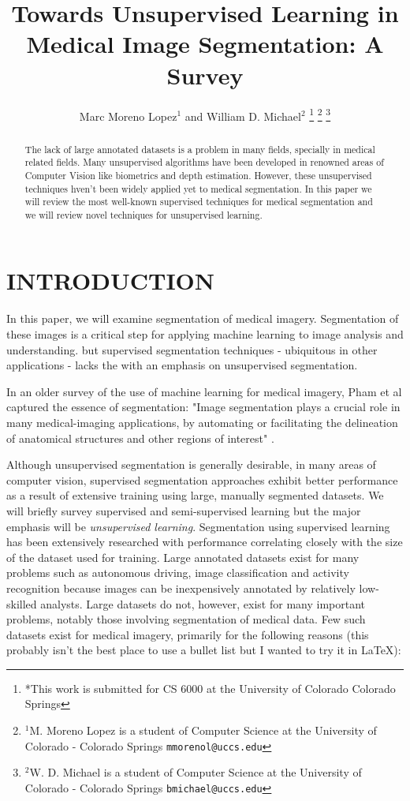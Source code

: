 \documentclass[letterpaper, 10 pt, conference]{ieeeconf}  %
\title{\LARGE \bf
Towards Unsupervised Learning in Medical Image Segmentation: A Survey
}
\author{Marc Moreno Lopez$^{1}$ and William D. Michael$^{2}$%
\thanks{*This work is submitted for CS 6000 at the University of Colorado Colorado Springs}%
\thanks{$^{1}$M. Moreno Lopez is a student of Computer Science at the University of Colorado - Colorado Springs
        {\tt\small mmorenol@uccs.edu}}%
\thanks{$^{2}$W. D. Michael is a student of Computer Science at the University of Colorado - Colorado Springs
        {\tt\small bmichael@uccs.edu}}%
}
\begin{document}
\maketitle
\thispagestyle{empty}
\pagestyle{empty}

\begin{abstract}

The lack of large annotated datasets is a problem in many fields, specially in medical related fields. Many unsupervised algorithms have been developed in renowned areas of Computer Vision like biometrics and depth estimation. However, these unsupervised techniques hven't been widely applied yet to medical segmentation. In this paper we will review the most well-known supervised techniques for medical segmentation and we will review novel techniques for unsupervised learning.

\end{abstract}

\section{INTRODUCTION}
In this paper, we will examine segmentation of medical imagery. Segmentation of these images is a critical step for applying machine learning to image analysis and understanding. but supervised segmentation techniques - ubiquitous in other applications -  lacks the with an emphasis on unsupervised segmentation. 

In an older survey of the use of machine learning for medical imagery, Pham et al captured the essence of segmentation: "Image segmentation plays a crucial role in many medical-imaging applications, by automating or facilitating the delineation of anatomical structures and other regions of interest" \cite{pham2000current}.

Although unsupervised segmentation is generally desirable, in many areas of computer vision, supervised segmentation approaches exhibit better performance as a result of extensive training using large, manually segmented datasets. We will briefly survey supervised and semi-supervised learning but the major emphasis will be \textit{unsupervised learning}. Segmentation using supervised learning has been extensively researched with performance correlating closely with the size of the dataset used for training. Large annotated datasets exist for many problems such as autonomous driving, image classification and activity recognition because images can be inexpensively annotated by relatively low-skilled analysts. Large datasets do not, however, exist for many important problems, notably those involving segmentation of medical data. Few such datasets exist for medical imagery, primarily for the following reasons (this probably isn't the best place to use a bullet list but I wanted to try it in \LaTeX{}):
\end{document}
